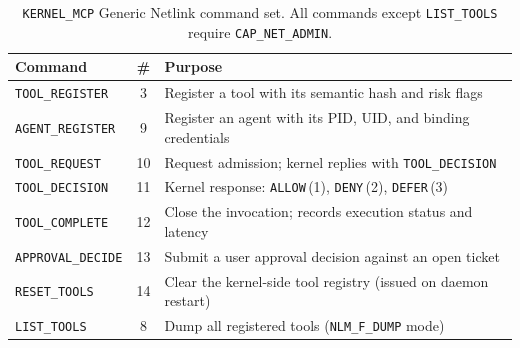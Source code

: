 \begin{table}[H]
\centering
\caption{\texttt{KERNEL\_\allowbreak MCP} Generic Netlink command set. All commands except \texttt{LIST\_\allowbreak TOOLS} require \texttt{CAP\_\allowbreak NET\_\allowbreak ADMIN}.}
\label{tab:netlink-cmds}
\footnotesize
\setlength{\tabcolsep}{4pt}\renewcommand{\arraystretch}{1.0}
\begin{tabular}{@{}lc p{8.2cm}@{}}
\toprule
\textbf{Command} & \textbf{\#} & \textbf{Purpose} \\
\midrule
\texttt{TOOL\_\allowbreak REGISTER}   & 3  & Register a tool with its semantic hash and risk flags \\
\texttt{AGENT\_\allowbreak REGISTER}  & 9  & Register an agent with its PID, UID, and binding credentials \\
\texttt{TOOL\_\allowbreak REQUEST}    & 10 & Request admission; kernel replies with \texttt{TOOL\_\allowbreak DECISION} \\
\texttt{TOOL\_\allowbreak DECISION}   & 11 & Kernel response: \texttt{ALLOW}\,(1), \texttt{DENY}\,(2), \texttt{DEFER}\,(3) \\
\texttt{TOOL\_\allowbreak COMPLETE}   & 12 & Close the invocation; records execution status and latency \\
\texttt{APPROVAL\_\allowbreak DECIDE} & 13 & Submit a user approval decision against an open ticket \\
\texttt{RESET\_\allowbreak TOOLS}     & 14 & Clear the kernel-side tool registry (issued on daemon restart) \\
\texttt{LIST\_\allowbreak TOOLS}      & 8  & Dump all registered tools (\texttt{NLM\_\allowbreak F\_\allowbreak DUMP} mode) \\
\bottomrule
\end{tabular}
\end{table}


